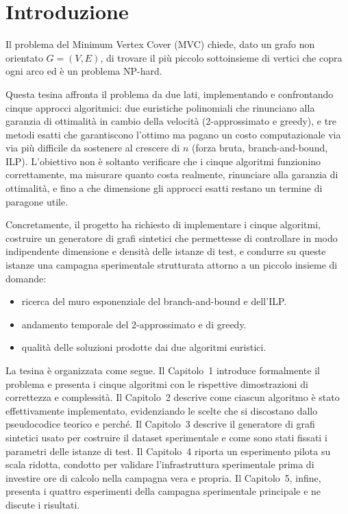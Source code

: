 \chapter*{Introduzione}

Il problema del Minimum Vertex Cover (MVC) chiede, dato un grafo non orientato $G=(V,E)$, di trovare il più piccolo sottoinsieme di vertici che copra ogni arco ed è un problema NP-hard.

Questa tesina affronta il problema da due lati, implementando e confrontando cinque approcci algoritmici: due euristiche polinomiali che rinunciano alla garanzia di ottimalità in cambio della velocità (2-approssimato e greedy), e tre metodi esatti che garantiscono l'ottimo ma pagano un costo computazionale via via più difficile da sostenere al crescere di $n$ (forza bruta, branch-and-bound, ILP). 
L'obiettivo non è soltanto verificare che i cinque algoritmi funzionino correttamente, ma misurare quanto costa realmente, rinunciare alla garanzia di ottimalità, e fino a che dimensione gli approcci esatti restano un termine di paragone utile.

Concretamente, il progetto ha richiesto di implementare i cinque algoritmi, costruire un generatore di grafi sintetici che permettesse di controllare in modo indipendente dimensione e densità delle istanze di test, e condurre su queste istanze una campagna sperimentale strutturata attorno a un piccolo insieme di domande:
\begin{itemize}
    \item ricerca del muro esponenziale del branch-and-bound e dell'ILP.
    \item andamento temporale del 2-approssimato e di greedy.
    \item qualità delle soluzioni prodotte dai due algoritmi euristici.
\end{itemize}

La tesina è organizzata come segue. 
Il Capitolo~1 introduce formalmente il problema e presenta i cinque algoritmi con le rispettive dimostrazioni di correttezza e complessità. 
Il Capitolo~2 descrive come ciascun algoritmo è stato effettivamente implementato, evidenziando le scelte che si discostano dallo pseudocodice teorico e perché. 
Il Capitolo~3 descrive il generatore di grafi sintetici usato per costruire il dataset sperimentale e come sono stati fissati i parametri delle istanze di test. 
Il Capitolo~4 riporta un esperimento pilota su scala ridotta, condotto per validare l'infrastruttura sperimentale prima di investire ore di calcolo nella campagna vera e propria. 
Il Capitolo~5, infine, presenta i quattro esperimenti della campagna sperimentale principale e ne discute i risultati.
